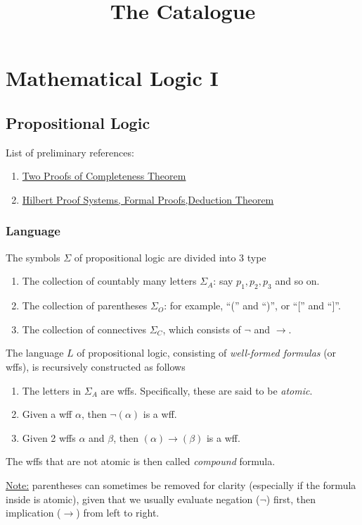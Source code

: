 \documentclass{treatise}
\title{The Catalogue}
\date{}
\begin{document}
\maketitle
\tableofcontents

\chapter{Mathematical Logic I}
\section{Propositional Logic}
\begin{shaded}
List of preliminary references:
\begin{enumerate}
    \item \href{https://www3.cs.stonybrook.edu/~cse541/chapter9new.pdf}{Two Proofs of Completeness Theorem}
    \item \href{https://www3.cs.stonybrook.edu/~cse541/chapter8.pdf}{Hilbert Proof Systems, Formal Proofs,Deduction Theorem}
\end{enumerate}
\hrulefill
\end{shaded}
\subsection{Language}
The symbols $\Sigma$ of propositional logic are divided into 3 type
\begin{enumerate}
    \item The collection of countably many letters $\Sigma_A$: say $p_1, p_2, p_3$ and so on.
    \item The collection of parentheses $\Sigma_O$: for example, ``('' and ``)'', or ``['' and ``]''.
    \item The collection of connectives $\Sigma_C$, which consists of $\neg$ and $\to$.
\end{enumerate}
\begin{definition}
The language $L$ of propositional logic, consisting of \emph{well-formed formulas} (or wffs), is recursively constructed as follows
\begin{enumerate}
    \item The letters in $\Sigma_A$ are wffs. Specifically, these are said to be \emph{atomic}.
    \item Given a wff $\alpha$, then $\neg \left( \alpha \right)$ is a wff.
    \item Given 2 wffs $\alpha$ and $\beta$, then $\left( \alpha \right) \to \left( \beta \right)$ is a wff.
\end{enumerate}
The wffs that are not atomic is then called \emph{compound} formula.
\end{definition}
\underline{Note:} parentheses can sometimes be removed for clarity (especially if the formula inside is atomic), given that we usually evaluate negation ($\neg$) first, then implication ($\to$) from left to right.
\end{document}
